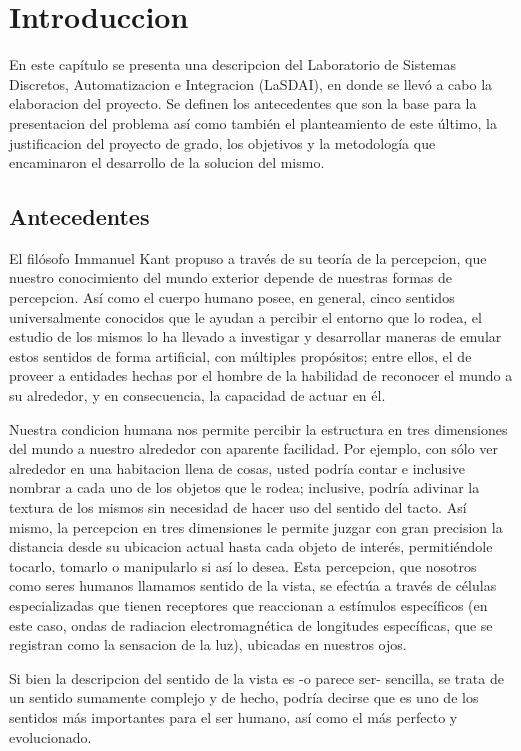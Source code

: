 \chapter{Introduccion}

En este capítulo se presenta una descripcion del Laboratorio de Sistemas Discretos, Automatizacion e Integracion (LaSDAI), en donde se llevó a cabo la elaboracion del proyecto. Se definen los antecedentes que son la base para la presentacion del problema así como también el planteamiento de este último, la justificacion del proyecto de grado, los objetivos y la metodología que encaminaron el desarrollo de la solucion del mismo.

\section{Antecedentes}

El filósofo Immanuel Kant propuso a través de su teoría de la percepcion, que nuestro conocimiento del mundo exterior depende de nuestras formas de percepcion. Así como el cuerpo humano posee, en general, cinco sentidos universalmente conocidos que le ayudan a percibir el entorno que lo rodea, el estudio de los mismos lo ha llevado a investigar y desarrollar maneras de emular estos sentidos de forma artificial, con múltiples propósitos; entre ellos, el de proveer a entidades hechas por el hombre de la habilidad de reconocer el mundo a su alrededor, y en consecuencia, la capacidad de actuar en él.

Nuestra condicion humana nos permite percibir la estructura en tres dimensiones del mundo a nuestro alrededor con aparente facilidad. Por ejemplo, con sólo ver alrededor en una habitacion llena de cosas, usted podría contar e inclusive nombrar a cada uno de los objetos que le rodea; inclusive, podría adivinar la textura de los mismos sin necesidad de hacer uso del sentido del tacto. Así mismo, la percepcion en tres dimensiones le permite juzgar con gran precision la distancia desde su ubicacion actual hasta cada objeto de interés, permitiéndole tocarlo, tomarlo o manipularlo si así lo desea. Esta percepcion, que nosotros como seres humanos llamamos sentido de la vista, se efectúa a través de células especializadas que tienen receptores que reaccionan a estímulos específicos (en este caso, ondas de radiacion electromagnética de longitudes específicas, que se registran como la sensacion de la luz), ubicadas en nuestros ojos.

Si bien la descripcion del sentido de la vista es -o parece ser- sencilla, se trata de un sentido sumamente complejo y de hecho, podría decirse que es uno de los sentidos más importantes para el ser humano, así como el más perfecto y evolucionado.

